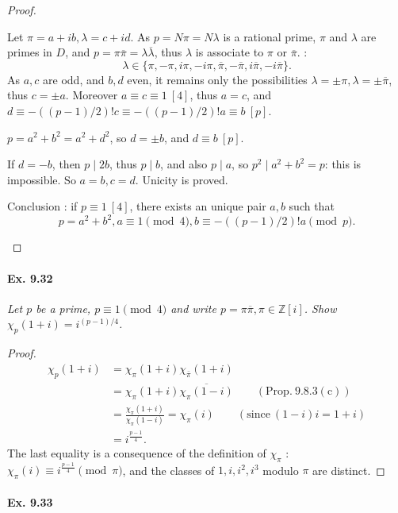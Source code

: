 \documentclass[11pt,a4paper]{article}
\newcommand{\Z}{\mathbb{Z}}
\begin{document}
\begin{proof}
\begin{enumerate}
Let $\pi = a + ib, \lambda = c+id$. As $p = N\pi = N \lambda$ is a rational prime, $\pi$ and $\lambda$ are primes in $D$, and $p = \pi \overline{\pi} = \lambda \overline{\lambda}$, thus $\lambda$ is associate to $\pi$ or $\overline{\pi}$. :
$$\lambda \in \{\pi, - \pi, i \pi, -i\pi, \overline{\pi},-\overline{\pi},i\overline{\pi},-i\overline{\pi}\}.$$
As $a,c$ are odd, and $b,d$ even, it remains only the possibilities $\lambda =\pm \pi, \lambda = \pm \overline{\pi}$, thus $c = \pm a$. Moreover $a \equiv c \equiv 1 \ [4]$, thus $a=c$, and $d \equiv -((p-1)/2)!c \equiv -((p-1)/2)!a \equiv b \ [p]$.

$p=a^2+b^2 = a^2 + d^2$, so $d = \pm b$, and $d \equiv b \ [p]$.

If $d = -b$, then $p\mid 2b$, thus $p \mid b$, and also $p \mid a$, so $p^2 \mid a^2+b^2 = p$: this is impossible. So $a=b,c=d$. Unicity is proved.

Conclusion : if $p\equiv 1 \ [4]$, there exists an unique pair $a,b$ such that
$$p=a^2+b^2, a \equiv 1 \pmod 4, b \equiv -((p-1)/2)! a \pmod p.$$
\end{enumerate}
\end{proof}

\paragraph{Ex. 9.32}

{\it Let $p$ be a prime, $p\equiv 1 \pmod 4$ and write $p = \pi \overline{\pi}, \pi \in \Z[i]$. Show $\chi_p(1+i) = i^{(p-1)/4}$.
}

\begin{proof}


\begin{align*}
\chi_p(1+i) &= \chi_\pi(1+i) \chi_{\bar{\pi}}(1+i) \\
&= \chi_\pi(1+i) \overline{\chi_\pi(1-i)} \qquad ( \mathrm{Prop.}\  \mathrm{9.8.3(c)})\\
& =\frac{\chi_\pi(1+i)}{\chi_\pi(1-i) }= \chi_\pi(i) \qquad (\mathrm{since}\  (1-i)i = 1+i)\\
&=i^{\frac{p-1}{4}}.
\end{align*}
The last equality is a consequence of the definition of $\chi_\pi$ : $\chi_\pi(i) \equiv i^{\frac{p-1}{4}} \pmod \pi$, and the classes of $1,i,i^2,i^3$ modulo $\pi$ are distinct.
\end{proof}

\paragraph{Ex. 9.33}
\end{document}
